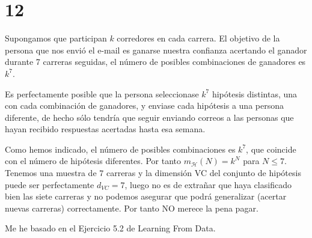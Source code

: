 \documentclass{article}
\begin{document}
\section{12}

Supongamos que participan \(k\) corredores en cada carrera. El
objetivo de la persona que nos envió el e-mail es ganarse nuestra
confianza acertando el ganador durante 7 carreras seguidas, el número
de posibles combinaciones de ganadores es \(k^7\).

Es perfectamente posible que la persona seleccionase \(k^7\) hipótesis
distintas, una con cada combinación de ganadores, y enviase cada
hipótesis a una persona diferente, de hecho sólo tendría que seguir
enviando correos a las personas que hayan recibido respuestas
acertadas hasta esa semana.

Como hemos indicado, el número de posibles combinaciones es \(k^7\),
que coincide con el número de hipótesis diferentes. Por tanto
\(m_{\mathcal{H}}(N)=k^N\) para \(N\leq 7\). Tenemos una muestra de
\(7\) carreras y la dimensión VC del conjunto de hipótesis puede ser
perfectamente \(d_{VC}=7\), luego no es de extrañar que haya
clasificado bien las siete carreras y no podemos asegurar que podrá
generalizar (acertar nuevas carreras) correctamente. Por tanto NO
merece la pena pagar.


Me he basado en el Ejercicio 5.2 de Learning From Data.
\end{document}
